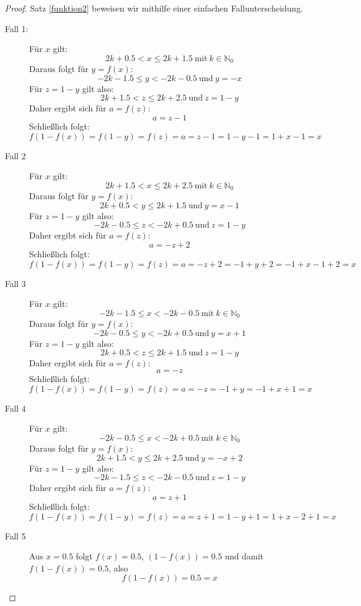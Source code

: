 \documentclass[12pt]{article}
\numberwithin{equation}{subsection}
\begin{document}
\begin{proof}
	 Satz \ref{funktion2} beweisen wir mithilfe einer einfachen Fallunterscheidung.
\begin{description}
\item[Fall 1:]
Für $x$ gilt:
\[2k+0.5 < x \leq 2k+1.5\ \mathrm{mit}\ k\in\mathbb{N}_0\]
Daraus folgt für $y=f(x)$:
\[-2k-1.5 \leq y < -2k-0.5\ \mathrm{und}\ y=-x\]
Für $z=1-y$ gilt also:
\[2k+1.5 < z \leq 2k+2.5\ \mathrm{und}\ z=1-y\]
Daher ergibt sich für $a=f(z)$:
\[a=z-1\]
Schließlich folgt:
\[f(1-f(x))=f(1-y)=f(z)=a=z-1=1-y-1=1+x-1=x\]

\item[Fall 2]
Für $x$ gilt:
\[2k+1.5 < x \leq 2k+2.5\ \mathrm{mit}\ k\in\mathbb{N}_0\]
Daraus folgt für $y=f(x)$:
\[2k+0.5 < y \leq 2k+1.5\ \mathrm{und}\ y=x-1\]
Für $z=1-y$ gilt also:
\[-2k-0.5 \leq z < -2k+0.5\ \mathrm{und}\ z=1-y\]
Daher ergibt sich für $a=f(z)$:
\[a=-z+2\]
Schließlich folgt:
\[f(1-f(x))=f(1-y)=f(z)=a=-z+2=-1+y+2=-1+x-1+2=x\]

\item[Fall 3]
Für $x$ gilt:
\[-2k-1.5 \leq x < -2k-0.5\ \mathrm{mit}\ k\in\mathbb{N}_0\]
Daraus folgt für $y=f(x)$:
\[-2k-0.5 \leq y < -2k+0.5\ \mathrm{und}\ y=x+1\]
Für $z=1-y$ gilt also:
\[2k+0.5 < z \leq 2k+1.5\ \mathrm{und}\ z=1-y\]
Daher ergibt sich für $a=f(z)$:
\[a=-z\]
Schließlich folgt:
\[f(1-f(x))=f(1-y)=f(z)=a=-z=-1+y=-1+x+1=x\]

\item[Fall 4]
Für $x$ gilt:
\[-2k-0.5 \leq x < -2k+0.5\ \mathrm{mit}\ k\in\mathbb{N}_0\]
Daraus folgt für $y=f(x)$:
\[2k+1.5 < y \leq 2k+2.5\ \mathrm{und}\ y=-x+2\]
Für $z=1-y$ gilt also:
\[-2k-1.5 \leq z < -2k-0.5\ \mathrm{und}\ z=1-y\]
Daher ergibt sich für $a=f(z)$:
\[a=z+1\]
Schließlich folgt:
\[f(1-f(x))=f(1-y)=f(z)=a=z+1=1-y+1=1+x-2+1=x\]
\item[Fall 5]
Aus $x=0.5$ folgt $f(x)=0.5$, $(1-f(x))=0.5$ und damit $f(1-f(x))=0.5$, also
\[f(1-f(x))=0.5=x\]
\end{description}
\end{proof}
\end{document}
